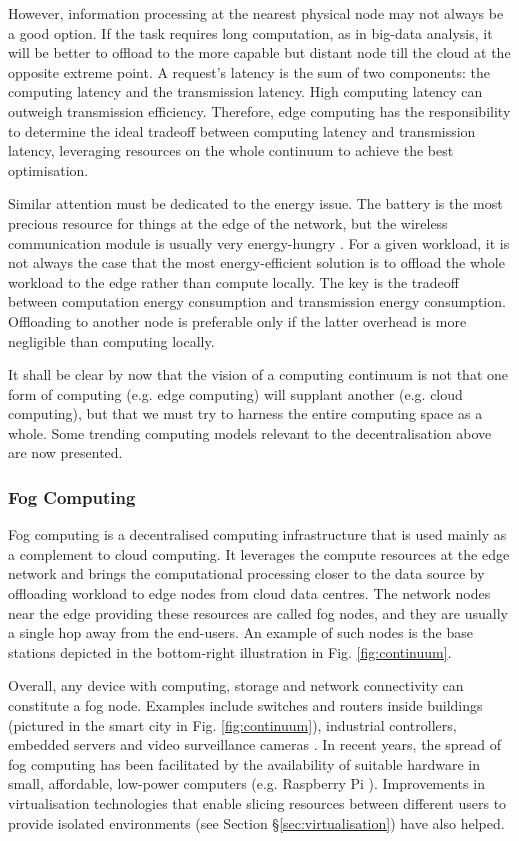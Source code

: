 However, information processing at the nearest physical node may not always be a good option. If the task requires long computation, as in big-data analysis, it will be better to offload to the more capable but distant node till the cloud at the opposite extreme point. A request's latency is the sum of two components: the computing latency and the transmission latency. High computing latency can outweigh transmission efficiency. Therefore, edge computing has the responsibility to determine the ideal tradeoff between computing latency and transmission latency, leveraging resources on the whole continuum to achieve the best optimisation.

Similar attention must be dedicated to the energy issue. The battery is the most precious resource for things at the edge of the network, but the wireless communication module is usually very energy-hungry \cite{shi2016edge}. For a given workload, it is not always the case that the most energy-efficient solution is to offload the whole workload to the edge rather than compute locally. The key is the tradeoff between computation energy consumption and transmission energy consumption. Offloading to another node is preferable only if the latter overhead is more negligible than computing locally.

It shall be clear by now that the vision of a computing continuum is not that one form of computing (e.g. edge computing) will supplant another (e.g. cloud computing), but that we must try to harness the entire computing space as a whole. Some trending computing models relevant to the decentralisation above are now presented.

\subsubsection{Fog Computing}

Fog computing \cite{fog-computing} is a decentralised computing infrastructure that is used mainly as a complement to cloud computing. It leverages the compute resources at the edge network and brings the computational processing closer to the data source by offloading workload to edge nodes from cloud data centres. The network nodes near the edge providing these resources are called fog nodes, and they are usually a single hop away from the end-users. An example of such nodes is the base stations depicted in the bottom-right illustration in Fig. \ref{fig:continuum}.

Overall, any device with computing, storage and network connectivity can constitute a fog node. Examples include switches and routers inside buildings (pictured in the smart city in Fig. \ref{fig:continuum}), industrial controllers, embedded servers and video surveillance cameras \cite{jang2018application}. In recent years, the spread of fog computing has been facilitated by the availability of suitable hardware in small, affordable, low-power computers (e.g. Raspberry Pi \cite{raspberry}).  Improvements in virtualisation technologies that enable slicing resources between different users to provide isolated environments (see Section §\ref{sec:virtualisation}) have also helped.

